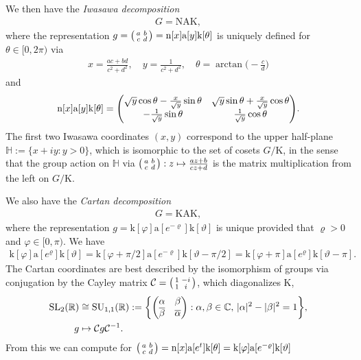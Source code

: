 \documentclass[12pt]{amsart}
\theoremstyle{definition}
\theoremstyle{remark}
\numberwithin{equation}{section}
\newcommand{\C}{{\mathbb C}}
\newcommand{\R}{{\mathbb R}}
\newcommand{\1}{{\mathbf 1}}
\newcommand{\SL}{\operatorname{SL}_2}
\begin{document}
We then have the \emph{Iwasawa decomposition}
\begin{align*}
    G= \mathrm{N} \mathrm{A} \mathrm{K}  ,
\end{align*}
where the representation $g= \smqty(a& b \\ c & d) = \mathrm{n}[x] \mathrm{a}[y] \mathrm{k}[\theta]$ is uniquely defined for $\theta \in [0,2\pi)$ via
\begin{align} \label{eq:matrixtoiwasawa}
   x= \frac{ac+bd}{c^2+d^2},\quad y= \frac{1}{c^2+d^2}, \quad \theta = \arctan \bigg(-\frac{c}{d}\bigg)
\end{align}
and 
\begin{align} \label{eq:iwasawatomatrix}
 \mathrm{n}[x] \mathrm{a}[y] \mathrm{k}[\theta] = \mqty( \sqrt{y} \cos \theta  - \frac{x}{\sqrt{y}} \sin \theta   &  \sqrt{y} \sin \theta  + \frac{x}{\sqrt{y}} \cos \theta \\ - \frac{1}{\sqrt{y}} \sin \theta &\frac{1}{\sqrt{y}} \cos \theta ).
\end{align}
The first two Iwasawa coordinates $(x,y)$ correspond to the upper half-plane $\mathbb{H}:=\{x+iy: y > 0\}$, which is isomorphic to the set of cosets $G/\mathrm{K}$, in the sense that the group action on $\mathbb{H}$ via $\smqty(a & b \\ c&d): z \mapsto \frac{az+b}{cz+d}$ is the matrix multiplication from the left on $G/\mathrm{K}$.

We also have the \emph{Cartan decomposition}
\begin{align*}
    G= \mathrm{K} \mathrm{A} \mathrm{K},
\end{align*}
where the representation $g = \mathrm{k}[\varphi] \mathrm{a}[e^{-\varrho}]\mathrm{k}[\vartheta] $ is unique provided that $\varrho > 0$ and $\varphi \in [0,\pi)$. We have
\begin{align} \label{eq:cartaninverserho}
    \mathrm{k}[\varphi] \mathrm{a}[e^{\varrho}]\mathrm{k}[\vartheta] = \mathrm{k}[\varphi + \pi/2] \mathrm{a}[e^{-\varrho}]\mathrm{k}[\vartheta - \pi/2] = \mathrm{k}[\varphi + \pi] \mathrm{a}[e^{\varrho}]\mathrm{k}[\vartheta - \pi].
\end{align}
The  Cartan coordinates are best described by the isomorphism of groups via conjugation by the Cayley matrix $\mathcal{C} = \smqty(1 & -i \\ 1 & i)$, which diagonalizes $\mathrm{K}$, 
\begin{align*}
    \SL(\R) &\cong \operatorname{SU}_{1,1}(\R) := \bigg\{ \mqty( \alpha & \beta \\ \overline{\beta} & \overline{\alpha}): \alpha,\beta \in \C, \, |\alpha|^2-|\beta|^2 = 1    \bigg\}, \\
    g &\mapsto \mathcal{C} g \mathcal{C}^{-1}.
\end{align*}
From this we can compute for $\smqty(a& b \\ c& d)= \mathrm{n}[x] \mathrm{a}[e^t] \mathrm{k}[\theta]=  \mathrm{k}[\varphi] \mathrm{a}[e^{-\varrho}]\mathrm{k}[\vartheta]  $
\end{document}
